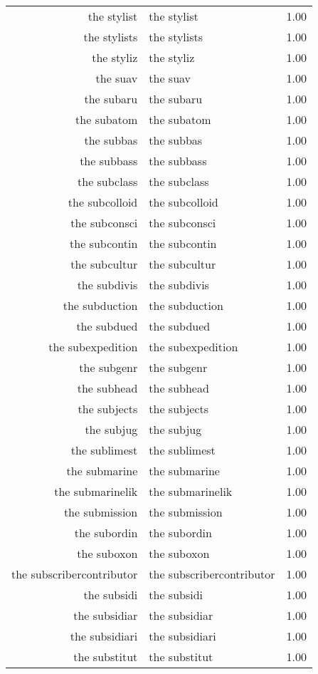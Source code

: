 \begin{table}[ht]
\begin{tabular}{rlr}
  the stylist & the stylist & 1.00 \\ 
  the stylists & the stylists & 1.00 \\ 
  the styliz & the styliz & 1.00 \\ 
  the suav & the suav & 1.00 \\ 
  the subaru & the subaru & 1.00 \\ 
  the subatom & the subatom & 1.00 \\ 
  the subbas & the subbas & 1.00 \\ 
  the subbass & the subbass & 1.00 \\ 
  the subclass & the subclass & 1.00 \\ 
  the subcolloid & the subcolloid & 1.00 \\ 
  the subconsci & the subconsci & 1.00 \\ 
  the subcontin & the subcontin & 1.00 \\ 
  the subcultur & the subcultur & 1.00 \\ 
  the subdivis & the subdivis & 1.00 \\ 
  the subduction & the subduction & 1.00 \\ 
  the subdued & the subdued & 1.00 \\ 
  the subexpedition & the subexpedition & 1.00 \\ 
  the subgenr & the subgenr & 1.00 \\ 
  the subhead & the subhead & 1.00 \\ 
  the subjects & the subjects & 1.00 \\ 
  the subjug & the subjug & 1.00 \\ 
  the sublimest & the sublimest & 1.00 \\ 
  the submarine & the submarine & 1.00 \\ 
  the submarinelik & the submarinelik & 1.00 \\ 
  the submission & the submission & 1.00 \\ 
  the subordin & the subordin & 1.00 \\ 
  the suboxon & the suboxon & 1.00 \\ 
  the subscribercontributor & the subscribercontributor & 1.00 \\ 
  the subsidi & the subsidi & 1.00 \\ 
  the subsidiar & the subsidiar & 1.00 \\ 
  the subsidiari & the subsidiari & 1.00 \\ 
  the substitut & the substitut & 1.00 \\ 

\end{tabular}
\end{table}
